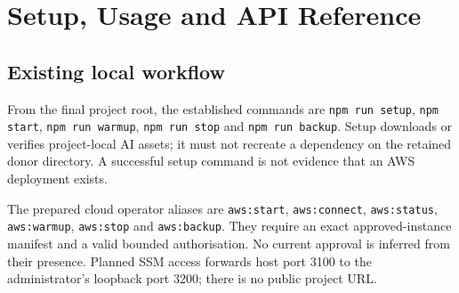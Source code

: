 \chapter{Setup, Usage and API Reference}
\label{app:usage}
\section{Existing local workflow}
From the final project root, the established commands are \texttt{npm run setup}, \texttt{npm start}, \texttt{npm run warmup}, \texttt{npm run stop} and \texttt{npm run backup}. Setup downloads or verifies project-local AI assets; it must not recreate a dependency on the retained donor directory. A successful setup command is not evidence that an AWS deployment exists.

The prepared cloud operator aliases are \texttt{aws:start}, \texttt{aws:connect}, \texttt{aws:status}, \texttt{aws:warmup}, \texttt{aws:stop} and \texttt{aws:backup}. They require an exact approved-instance manifest and a valid bounded authorisation. No current approval is inferred from their presence. Planned SSM access forwards host port 3100 to the administrator's loopback port 3200; there is no public project URL.
